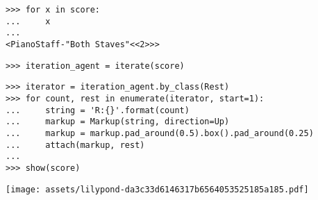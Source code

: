 \begin{comment}
<abjad>
for x in score:
    x

</abjad>
\end{comment}

\begin{abjadbookoutput}
\begin{singlespacing}
\vspace{-0.5\baselineskip}
\begin{lstlisting}
>>> for x in score:
...     x
...
<PianoStaff-"Both Staves"<<2>>>
\end{lstlisting}
\end{singlespacing}
\end{abjadbookoutput}

\begin{comment}
<abjad>
iteration_agent = iterate(score)
</abjad>
\end{comment}

\begin{abjadbookoutput}
\begin{singlespacing}
\vspace{-0.5\baselineskip}
\begin{lstlisting}
>>> iteration_agent = iterate(score)
\end{lstlisting}
\end{singlespacing}
\end{abjadbookoutput}

\begin{comment}
<abjad>
iterator = iteration_agent.by_class(Rest)
for count, rest in enumerate(iterator, start=1):
    string = 'R:{}'.format(count)
    markup = Markup(string, direction=Up)
    markup = markup.pad_around(0.5).box().pad_around(0.25)
    attach(markup, rest)

show(score)
</abjad>
\end{comment}

\begin{abjadbookoutput}
\begin{singlespacing}
\vspace{-0.5\baselineskip}
\begin{lstlisting}
>>> iterator = iteration_agent.by_class(Rest)
>>> for count, rest in enumerate(iterator, start=1):
...     string = 'R:{}'.format(count)
...     markup = Markup(string, direction=Up)
...     markup = markup.pad_around(0.5).box().pad_around(0.25)
...     attach(markup, rest)
...
>>> show(score)
\end{lstlisting}
\noindent\texttt{[image: assets/lilypond-da3c33d6146317b6564053525185a185.pdf]}
\end{singlespacing}
\end{abjadbookoutput}

